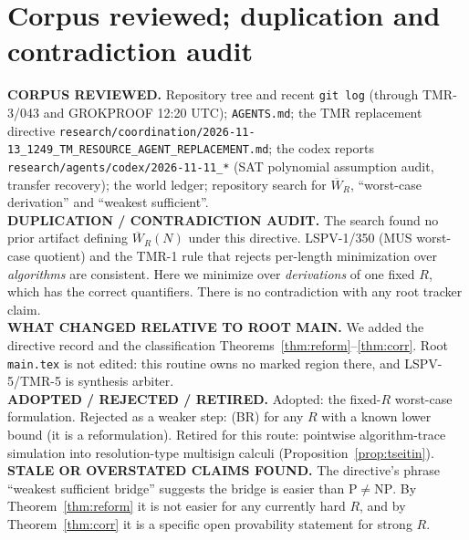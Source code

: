 \documentclass[11pt]{article}
\theoremstyle{definition}
\newcommand{\Wb}{\overline W}
\begin{document}
\section{Corpus reviewed; duplication and contradiction audit}
\textbf{CORPUS REVIEWED.} Repository tree and recent \texttt{git log} (through TMR-3/043 and
GROKPROOF 12:20 UTC); \texttt{AGENTS.md}; the TMR replacement directive
\texttt{research/coordination/2026-11-13\_1249\_TM\_RESOURCE\_AGENT\_REPLACEMENT.md};
the codex reports \texttt{research/agents/codex/2026-11-11\_*} (SAT polynomial assumption
audit, transfer recovery); the world ledger; repository search for
$\Wb_R$, ``worst-case derivation'' and ``weakest sufficient''.\\
\textbf{DUPLICATION / CONTRADICTION AUDIT.} The search found no prior artifact defining
$\Wb_R(N)$ under this directive. LSPV-1/350 (MUS worst-case quotient) and the TMR-1 rule
that rejects per-length minimization over \emph{algorithms} are consistent. Here we
minimize over \emph{derivations} of one fixed $R$, which has the correct quantifiers.
There is no contradiction with any root tracker claim.\\
\textbf{WHAT CHANGED RELATIVE TO ROOT MAIN.} We added the directive record and the
classification Theorems~\ref{thm:reform}--\ref{thm:corr}. Root \texttt{main.tex} is not
edited: this routine owns no marked region there, and LSPV-5/TMR-5 is synthesis arbiter.\\
\textbf{ADOPTED / REJECTED / RETIRED.} Adopted: the fixed-$R$ worst-case formulation.
Rejected as a weaker step: (BR) for any $R$ with a known lower bound (it is a
reformulation). Retired for this route: pointwise algorithm-trace simulation into
resolution-type multisign calculi (Proposition~\ref{prop:tseitin}).\\
\textbf{STALE OR OVERSTATED CLAIMS FOUND.} The directive's phrase ``weakest sufficient
bridge'' suggests the bridge is easier than $\mathrm{P}\ne\mathrm{NP}$. By
Theorem~\ref{thm:reform} it is not easier for any currently hard $R$, and by
Theorem~\ref{thm:corr} it is a specific open provability statement for strong $R$.
\end{document}
